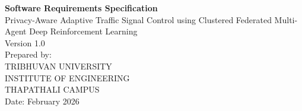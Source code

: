 \begin{titlepage}
\centering
\vspace*{2cm}
{\Huge \textbf{Software Requirements Specification}} \\
\vspace{1cm}
{\Large Privacy-Aware Adaptive Traffic Signal Control using Clustered Federated Multi-Agent Deep Reinforcement Learning} \\
\vspace{1cm}
{\large Version 1.0} \\
\vspace{2cm}
{\large Prepared by:} \\
{\large TRIBHUVAN UNIVERSITY} \\
{\large INSTITUTE OF ENGINEERING} \\
{\large THAPATHALI CAMPUS} \\
\vspace{2cm}
{\large Date: February 2026} \\
\vfill
\end{titlepage}